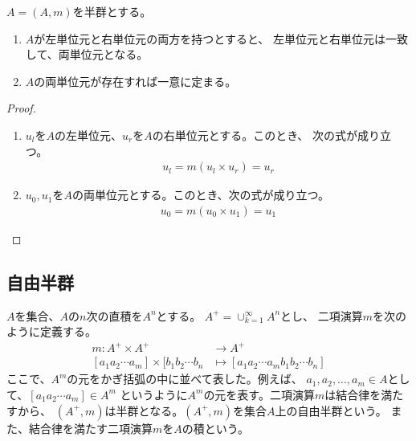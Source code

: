 \begin{proposition}[単位元の一意性]\label{prop:単位元の一意性}
$A=(A,m)$を半群とする。
\begin{enumerate}
	\item $A$が左単位元と右単位元の両方を持つとすると、
	左単位元と右単位元は一致して、両単位元となる。
	\item $A$の両単位元が存在すれば一意に定まる。
\end{enumerate}
\begin{proof}
	\begin{enumerate}
		\item $u_l$を$A$の左単位元、$u_r$を$A$の右単位元とする。このとき、
		次の式が成り立つ。
		\begin{equation*}\begin{split}
			u_l = m(u_l\times u_r) = u_r
		\end{split}\end{equation*}
		\item $u_0,u_1$を$A$の両単位元とする。このとき、次の式が成り立つ。
		\begin{equation*}\begin{split}
			u_0 = m(u_0\times u_1) = u_1
		\end{split}\end{equation*}
	\end{enumerate}
\end{proof}
\end{proposition}

\subsection{自由半群}\label{s2:自由半群} %
\begin{definition}[自由半群]\label{def:自由半群} %
$A$を集合、$A$の$n$次の直積を$A^n$とする。 $A^+=\cup_{k=1}^\infty A^n$とし、
二項演算$m$を次のように定義する。
\begin{equation*}\begin{split}
	m: A^+ \times A^+ &\to A^+ \\
		[a_1 a_2\cdots a_m] \times [b_1 b_2 \cdots b_n
			&\mapsto [a_1 a_2\cdots a_m b_1 b_2 \cdots b_n]
\end{split}\end{equation*}
ここで、$A^m$の元をかぎ括弧の中に並べて表した。例えば、
$a_1,a_2,\dots,a_m\in A$として、$[a_1 a_2\cdots a_m]\in A^m$
というように$A^m$の元を表す。二項演算$m$は結合律を満たすから、
$(A^+,m)$は半群となる。$(A^+,m)$を集合$A$上の自由半群という。
また、結合律を満たす二項演算$m$を$A$の積という。
\end{definition} %

